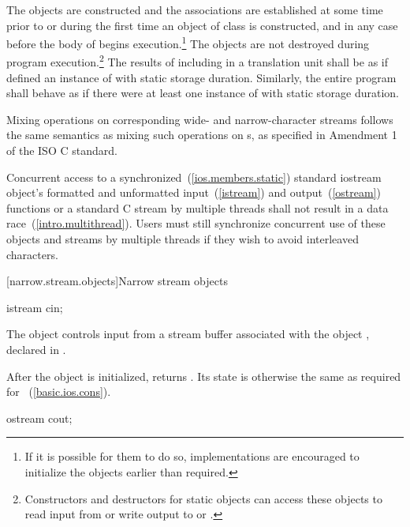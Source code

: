 \pnum
The objects are constructed and the associations are established at some
time prior to or during the first time an object of class
 is constructed, and in any case before the body
of  begins execution.\footnote{If it is possible for them to do so, implementations are encouraged to
initialize the objects earlier than required.}
The objects are not destroyed during program execution.\footnote{Constructors and destructors for static objects can
access these objects to read input from
or write output to
or
.
}
The results of including  in a translation unit shall be as if
 defined an instance of  with static
storage duration. Similarly, the entire program shall behave as if there were at least
one instance of  with static storage duration.

\pnum
Mixing operations on corresponding wide- and narrow-character streams
follows the same semantics as mixing such operations on
s,
as specified in Amendment 1 of the ISO C standard.

\pnum
Concurrent access to a synchronized~(\ref{ios.members.static}) standard iostream object's formatted and unformatted input~(\ref{istream}) and output~(\ref{ostream}) functions or a standard C stream by multiple threads shall not result in a data race~(\ref{intro.multithread}). \enternote Users must still synchronize concurrent use of these objects and streams by multiple threads if they wish to avoid interleaved characters. \exitnote

[narrow.stream.objects]{Narrow stream objects}

%
\begin{itemdecl}
istream cin;
\end{itemdecl}

\begin{itemdescr}
\pnum
The object
controls input from a stream buffer
associated with the object
,
declared in
%
.

\pnum
After the object
is initialized,
returns
.
Its state is otherwise the same as required for
~(\ref{basic.ios.cons}).
\end{itemdescr}

%
\begin{itemdecl}
ostream cout;
\end{itemdecl}

